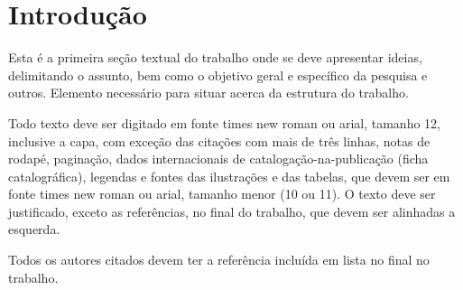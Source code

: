 \chapter{Introdução}
\label{chap:introducao}
Esta é a primeira seção textual do trabalho onde se deve apresentar ideias, delimitando o assunto, bem como o objetivo geral e específico da pesquisa e outros. Elemento necessário para situar acerca da estrutura do trabalho.

Todo texto deve ser digitado em fonte times new roman ou arial, tamanho 12, inclusive a capa, com exceção das citações com mais de três linhas, notas de rodapé, paginação, dados internacionais de catalogação-na-publicação (ficha catalográfica), legendas e fontes das ilustrações e das tabelas, que devem ser em fonte times new roman ou arial, tamanho menor (10 ou 11). O texto deve ser justificado, exceto as referências, no final do trabalho, que devem ser alinhadas a esquerda.

Todos os autores citados devem ter a referência incluída em lista no final no trabalho.


 
 